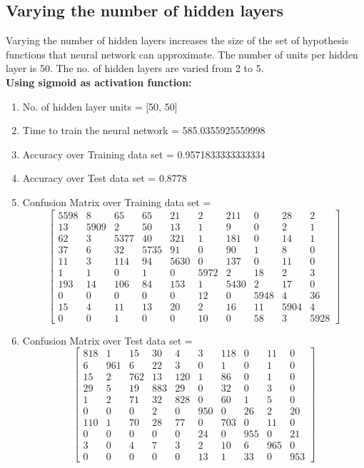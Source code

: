 \documentclass[11pt]{article}
\begin{document}
\subsection{Varying the number of hidden layers}
Varying the number of hidden layers increases the size of the set of hypothesis functions that neural network can approximate. The number of units per hidden layer is 50. The no. of hidden layers are varied from 2 to 5. \\
\textbf{Using sigmoid as activation function:}
\begin{enumerate}
\item No. of hidden layer units = [50, 50]
\item Time to train the neural network = 585.0355925559998
\item Accuracy over Training data set = 0.9571833333333334
\item Accuracy over Test data set = 0.8778
\item Confusion Matrix over Training data set = 
\begin{equation}
  \begin{bmatrix}
5598 & 8 & 65 & 65 & 21 & 2 & 211 & 0 & 28 & 2\\
13 & 5909 & 2 & 50 & 13 & 1 & 9 & 0 & 2 & 1\\
62 & 3 & 5377 & 40 & 321 & 1 & 181 & 0 & 14 & 1\\
37 & 6 & 32 & 5735 & 91 & 0 & 90 & 1 & 8 & 0\\
11 & 3 & 114 & 94 & 5630 & 0 & 137 & 0 & 11 & 0\\
1 & 1 & 0 & 1 & 0 & 5972 & 2 & 18 & 2 & 3\\
193 & 14 & 106 & 84 & 153 & 1 & 5430 & 2 & 17 & 0\\
0 & 0 & 0 & 0 & 0 & 12 & 0 & 5948 & 4 & 36\\
15 & 4 & 11 & 13 & 20 & 2 & 16 & 11 & 5904 & 4\\
0 & 0 & 1 & 0 & 0 & 10 & 0 & 58 & 3 & 5928
  \end{bmatrix}
\end{equation}
\item Confusion Matrix over Test data set = 
\begin{equation}
  \begin{bmatrix}
818 & 1 & 15 & 30 & 4 & 3 & 118 & 0 & 11 & 0\\
6 & 961 & 6 & 22 & 3 & 0 & 1 & 0 & 1 & 0\\
15 & 2 & 762 & 13 & 120 & 1 & 86 & 0 & 1 & 0\\
29 & 5 & 19 & 883 & 29 & 0 & 32 & 0 & 3 & 0\\
1 & 2 & 71 & 32 & 828 & 0 & 60 & 1 & 5 & 0\\
0 & 0 & 0 & 2 & 0 & 950 & 0 & 26 & 2 & 20\\
110 & 1 & 70 & 28 & 77 & 0 & 703 & 0 & 11 & 0\\
0 & 0 & 0 & 0 & 0 & 24 & 0 & 955 & 0 & 21\\
3 & 0 & 4 & 7 & 3 & 2 & 10 & 6 & 965 & 0\\
0 & 0 & 0 & 0 & 0 & 13 & 1 & 33 & 0 & 953
  \end{bmatrix}
\end{equation}
\end{enumerate}
\end{document}
